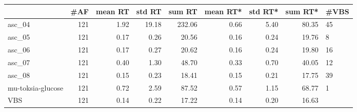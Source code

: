 \begin{tabular}{lrrrrrrrl}
\toprule
{} &  \#AF &  mean RT &  std RT &  sum RT &  mean RT* &  std RT* &  sum RT* & \#VBS \\
\midrule
asc\_04            &  121 &     1.92 &   19.18 &  232.06 &      0.66 &     5.40 &    80.35 &   45 \\
asc\_05            &  121 &     0.17 &    0.26 &   20.56 &      0.16 &     0.24 &    19.76 &    8 \\
asc\_06            &  121 &     0.17 &    0.27 &   20.62 &      0.16 &     0.24 &    19.80 &   16 \\
asc\_07            &  121 &     0.40 &    1.30 &   48.70 &      0.33 &     0.70 &    40.05 &   12 \\
asc\_08            &  121 &     0.15 &    0.23 &   18.41 &      0.15 &     0.21 &    17.75 &   39 \\
mu-toksia-glucose &  121 &     0.72 &    2.59 &   87.52 &      0.57 &     1.15 &    68.77 &    1 \\
VBS               &  121 &     0.14 &    0.22 &   17.22 &      0.14 &     0.20 &    16.63 &      \\
\bottomrule
\end{tabular}
